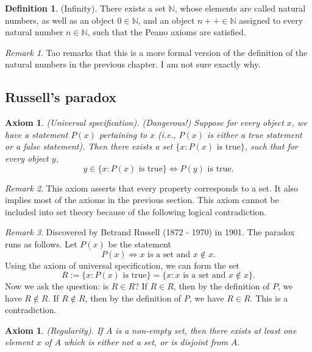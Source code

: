 \documentclass[12pt]{article}
\newtheorem{axiom}[theorem]{Axiom}
\theoremstyle{definition}
\newtheorem{definition}[theorem]{Definition}
\theoremstyle{remark}
\newtheorem*{remark}{Remark}
\begin{document}
\begin{definition}
    (Infinity). There exists a set $\mathbb{N}$, whose elements are called natural numbers, as well as an object $0 \in \mathbb{N}$, and an object $n++ \in \mathbb{N}$ assigned to every natural number $n \in \mathbb{N}$, such that the Peano axioms are satisfied.
\end{definition}

\begin{remark}
    Tao remarks that this is a more formal version of the definition of the natural numbers in the previous chapter. I am not sure exactly why.
\end{remark}

\subsection{Russell's paradox}

\begin{axiom}
    (Universal specification). (Dangerous!) Suppose for every object $x$, we have a statement $P(x)$ pertaining to $x$ (i.e., $P(x)$ is either a true statement or a false statement). Then there exists a set $\{x \colon P(x) \text{ is true}\}$, such that for every object $y$, \[
        y \in \{x \colon P(x) \text{ is true}\} \iff P(y) \text{ is true}
    .\]
\end{axiom}

\begin{remark}
    This axiom asserts that every property corresponds to a set. It also implies most of the axioms in the previous section. This axiom cannot be included into set theory because of the following logical contradiction.
\end{remark}

\begin{remark}
    Discovered by Betrand Russell (1872 - 1970) in 1901. The paradox runs as follows. Let $P(x)$ be the statement \[
    P(x) \iff x \text{ is a set and } x \not\in x
    .\] 
    Using the axiom of universal specification, we can form the set \[
        R := \{x \colon P(x) \text{ is true}\} = \{x \colon x \text{ is a set and } x \not\in x\}
    .\] Now we ask the question: is $R \in R$? If $R \in R$, then by the definition of $P$, we have $R \not\in R$. If $R \not\in R$, then by the definition of $P$, we have $R \in R$. This is a contradiction.
\end{remark}

\begin{axiom}
    (Regularity). If $A$ is a non-empty set, then there exists at least one element $x$ of $A$ which is either not a set, or is disjoint from $A$.
\end{axiom}
\end{document}
